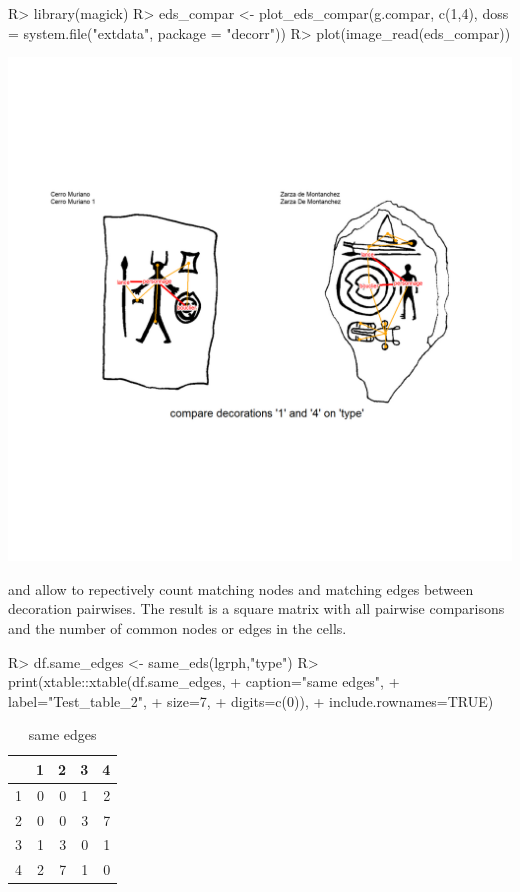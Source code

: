 \documentclass[article]{jss}
\begin{document}
\begin{Schunk}
\begin{Sinput}
R> library(magick)
R> eds_compar <- plot_eds_compar(g.compar, c(1,4), doss = system.file("extdata", package = "decorr"))
R> plot(image_read(eds_compar))
\end{Sinput}
\end{Schunk}
\includegraphics{article_rvTH12-011}

 and  allow to repectively count matching nodes and matching edges between decoration pairwises. The result is a square matrix with all pairwise comparisons and the number of common nodes or edges in the cells.

\begin{Schunk}
\begin{Sinput}
R> df.same_edges <- same_eds(lgrph,"type")
R> print(xtable::xtable(df.same_edges,
+                       caption="same edges",
+                       label="Test_table_2",
+                       size=7,
+                       digits=c(0)),
+        include.rownames=TRUE)
\end{Sinput}
\begin{table}[ht]
\centering
\begin{tabular}{rrrrr}
  \hline
 & 1 & 2 & 3 & 4 \\ 
  \hline
1 & 0 & 0 & 1 & 2 \\ 
  2 & 0 & 0 & 3 & 7 \\ 
  3 & 1 & 3 & 0 & 1 \\ 
  4 & 2 & 7 & 1 & 0 \\ 
   \hline
\end{tabular}
\caption{same edges} 
\label{Test_table_2}
\end{table}\end{Schunk}
\end{document}
